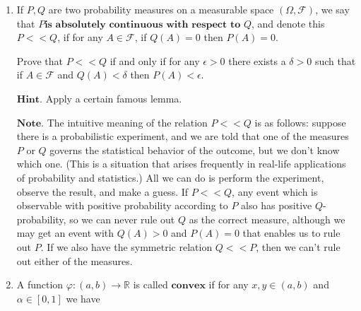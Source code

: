\documentclass[11pt]{report}
\providecommand{\cal}{\mathcal}
\newcommand{\R}{\mathbb{R}}
\theoremstyle{plain}
\theoremstyle{definition}
\begin{document}
\begin{enumerate}[label=\arabic*.]
\[
1_{\limsup A_n} = \limsup_n 1_{A_n}.
\]

(The lim-sup on the left refers to the lim-sup operation on events; on the right it refers to the lim-sup of a sequence of functions; the identity is an identity of real-valued functions on $\Omega$, i.e., should be satisfied for each individual point $\omega \in \Omega$ in the sample space). Similarly, show (either separately or by relying on the first claim) that

\[
1_{\liminf A_n} = \liminf_n 1_{A_n}.
\]

(b) Let $U$ be a uniform random variable in $(0,1)$. For each $n\ge 1$ define an event $A_n$ by

\[
A_n = \{U < 1/n\}.
\]

Note that $\sum_{n=1}^\infty \mathrm{P}(A_n) = \infty$. However, compute $\mathrm{P}(A_n\textrm{ i.o.})$ and show that the conclusion of the second Borel-Cantelli lemma does not hold (of course, one of the assumptions of the lemma also doesn't hold, so there's no contradiction).
\item If $P,Q$ are two probability measures on a measurable space $(\Omega, {\cal F})$, we say that $\textbf{$P$is absolutely continuous with respect to } Q$, and denote this $P<<Q$, if for any $A\in {\cal F}$, if $Q(A)=0$ then $P(A)=0$.

Prove that $P<<Q$ if and only if for any $\epsilon>0$ there exists a $\delta>0$ such that if $A\in {\cal F}$ and $Q(A)<\delta$ then $P(A)<\epsilon$.

$\textbf{Hint.}$ Apply a certain famous lemma.

$\textbf{Note.}$ The intuitive meaning of the relation $P<<Q$ is as follows: suppose there is a probabilistic experiment, and we are told that one of the measures $P$ or $Q$ governs the statistical behavior of the outcome, but we don't know which one. (This is a situation that arises frequently in real-life applications of probability and statistics.) All we can do is perform the experiment, observe the result, and make a guess. If $P<<Q$, any event which is observable with positive probability according to $P$ also has positive $Q$-probability, so we can never rule out $Q$ as the correct measure, although we may get an event with $Q(A)>0$ and $P(A)=0$ that enables us to rule out $P$. If we also have the symmetric relation $Q<<P$, then we can't rule out either of the measures.
\item A function $\varphi:(a,b)\to\R$ is called $\textbf{convex}$ if for any $x,y\in (a,b)$ and $\alpha\in [0,1]$ we have


\end{enumerate}
\end{document}
